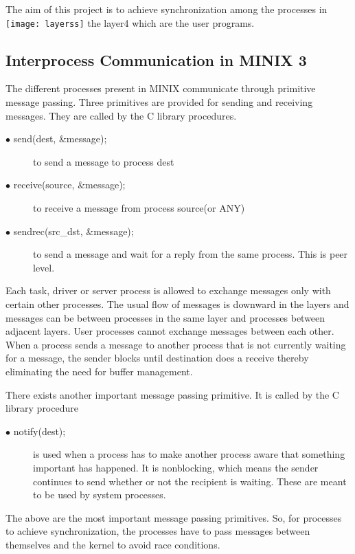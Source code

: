 \documentclass[a4paper,11pt,twocolumn]{article}
\begin{document}
The aim of this project is to achieve synchronization among the processes in \texttt{[image: layerss]} \clearpage the layer4 which are the user programs.

\subsection{Interprocess Communication in MINIX 3}
The different processes present in MINIX communicate through primitive message passing. Three primitives are provided for sending and receiving messages. They are called by the C library procedures.\\
\begin{description}
  \item[$\bullet$ send(dest, \&message);] to send a message to process dest
  \item[$\bullet$ receive(source, \&message);] to receive a message from process source(or ANY)
  \item[$\bullet$ sendrec(src\_dst, \&message);] to send a message and wait for a reply from the same process. This is peer level.
\end{description}

Each task, driver or server process is allowed to exchange messages only with certain other processes. The usual flow of messages is downward in the layers and messages can be between processes in the same layer and processes between adjacent layers. User processes cannot exchange messages between each other. When a process sends a message to another process that is not currently waiting for a message, the sender blocks until destination does a receive thereby eliminating the need for buffer management.

There exists another important message passing primitive. It is called by the C library procedure\\

\begin{description}
  \item[$\bullet$ notify(dest);] is used when a process has to make another process aware that something important has happened. It is nonblocking, which means the sender continues to send whether or not the recipient is waiting. These are meant to be used by system processes.
\end{description}
The above are the most important message passing primitives. So, for processes to achieve synchronization, the processes have to pass messages between themselves and the kernel to avoid race conditions.
\end{document}
